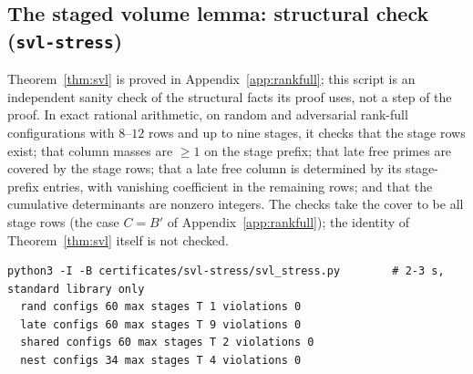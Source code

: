 \subsection{The staged volume lemma: structural check (\texttt{svl-stress})}\label{app:cert-svl}
Theorem~\ref{thm:svl} is proved in Appendix~\ref{app:rankfull}; this script is an independent sanity check of the structural facts
its proof uses, not a step of the proof. In exact rational arithmetic, on random and adversarial rank-full configurations with
$8$--$12$ rows and up to nine stages, it checks that the stage rows exist; that column masses are $\ge1$ on the stage prefix; that
late free primes are covered by the stage rows; that a late free column is determined by its stage-prefix entries, with vanishing
coefficient in the remaining rows; and that the cumulative determinants are nonzero integers. The checks take the cover to be all
stage rows (the case $C=B'$ of Appendix~\ref{app:rankfull}); the identity of Theorem~\ref{thm:svl} itself is not checked.
\begingroup\footnotesize
\begin{verbatim}
python3 -I -B certificates/svl-stress/svl_stress.py        # 2-3 s, standard library only
  rand configs 60 max stages T 1 violations 0
  late configs 60 max stages T 9 violations 0
  shared configs 60 max stages T 2 violations 0
  nest configs 34 max stages T 4 violations 0
\end{verbatim}
\endgroup

